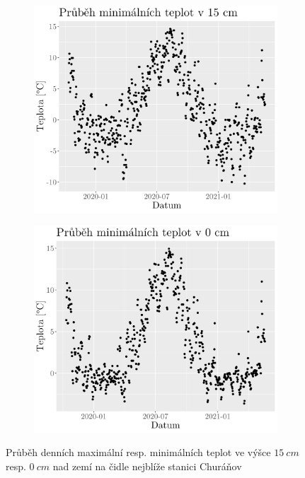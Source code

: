 \begin{figure}
	\hfill
	\begin{subfigure}{0.45\textwidth}
  \includegraphics[width=\textwidth]{img/maxtempmin15cm.png}
		\caption{}
		\label{fig:maxtempmin15cm}
	\end{subfigure}
	\hfill
	\begin{subfigure}{0.45\textwidth}
  \includegraphics[width=\textwidth]{img/maxtempmin0cm.png}
		\caption{}
		\label{fig:maxtempmin0cm}
	\end{subfigure}
	\caption{Průběh denních maximální resp. minimálních teplot ve výšce $\SI{15}{cm}$ resp. $\SI{0}{cm}$ nad zemí na čidle nejblíže stanici Churáňov}
	\label{fig:maxtemp}
\end{figure}

